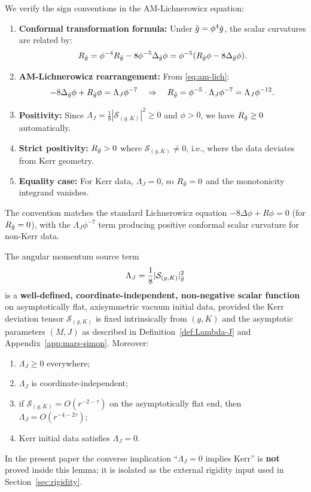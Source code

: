 \begin{remark}\label{rem:sign-verification}
We verify the sign conventions in the AM-Lichnerowicz equation:
\begin{enumerate}[label=\textup{(\roman*)}]
    \item \textbf{Conformal transformation formula:} Under $\tilde{g} = \phi^4 \bar{g}$, the scalar curvatures are related by:
    \[
    R_{\tilde{g}} = \phi^{-4} R_{\bar{g}} - 8\phi^{-5}\Delta_{\bar{g}}\phi = \phi^{-5}(R_{\bar{g}}\phi - 8\Delta_{\bar{g}}\phi).
    \]
    \item \textbf{AM-Lichnerowicz rearrangement:} From \eqref{eq:am-lich}:
    \[
    -8\Delta_{\bar{g}}\phi + R_{\bar{g}}\phi = \Lambda_J \phi^{-7} \quad \Rightarrow \quad R_{\tilde{g}} = \phi^{-5} \cdot \Lambda_J \phi^{-7} = \Lambda_J \phi^{-12}.
    \]
    \item \textbf{Positivity:} Since $\Lambda_J = \frac{1}{8}|\mathcal{S}_{(g,K)}|^2 \geq 0$ and $\phi > 0$, we have $R_{\tilde{g}} \geq 0$ automatically.
    \item \textbf{Strict positivity:} $R_{\tilde{g}} > 0$ where $\mathcal{S}_{(g,K)} \neq 0$, i.e., where the data deviates from Kerr geometry.
    \item \textbf{Equality case:} For Kerr data, $\Lambda_J = 0$, so $R_{\tilde{g}} = 0$ and the monotonicity integrand vanishes.
\end{enumerate}
The convention matches the standard Lichnerowicz equation $-8\Delta\phi + R\phi = 0$ (for $R_{\tilde{g}} = 0$), with the $\Lambda_J \phi^{-7}$ term producing positive conformal scalar curvature for non-Kerr data.
\end{remark}

\begin{lemma}\label{lem:Lambda-J-welldef}
The angular momentum source term
\[
\Lambda_J = \frac{1}{8}|\mathcal{S}_{(g,K)}|^2_{\bar{g}}
\]
is a \textbf{well-defined, coordinate-independent, non-negative scalar function} on asymptotically flat, axisymmetric vacuum initial data, provided the Kerr deviation tensor $\mathcal{S}_{(g,K)}$ is fixed intrinsically from $(g,K)$ and the asymptotic parameters $(M,J)$ as described in Definition~\ref{def:Lambda-J} and Appendix~\ref{app:mars-simon}. Moreover:
\begin{enumerate}[label=\textup{(\alph*)}]
    \item $\Lambda_J \geq 0$ everywhere;
    \item $\Lambda_J$ is coordinate-independent;
    \item if $\mathcal{S}_{(g,K)} = O(r^{-2-\tau})$ on the asymptotically flat end, then $\Lambda_J = O(r^{-4-2\tau})$;
    \item Kerr initial data satisfies $\Lambda_J = 0$.
\end{enumerate}
In the present paper the converse implication ``$\Lambda_J=0$ implies Kerr'' is \textbf{not} proved inside this lemma; it is isolated as the external rigidity input used in Section~\ref{sec:rigidity}.
\end{lemma}

